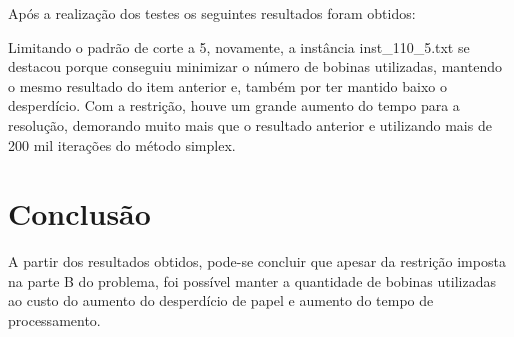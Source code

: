 \documentclass[12pt]{article}
\begin{document}
Após a realização dos testes os seguintes resultados foram obtidos:
\begin{table}[htbp]
    \centering
    \caption{Resultados obtidos após a realização dos testes para a parte B do problema}
\end{table}

Limitando o padrão de corte a 5, novamente, a instância inst\_110\_5.txt se destacou porque conseguiu minimizar 
o número de bobinas utilizadas, mantendo o mesmo resultado do item anterior e, também por ter mantido baixo o 
desperdício. Com a restrição, houve um grande aumento do tempo para a resolução, demorando muito mais que o 
resultado anterior e utilizando mais de 200 mil iterações do método simplex.

\newpage

\section{Conclusão} %

A partir dos resultados obtidos, pode-se concluir que apesar da restrição imposta na parte B do problema, 
foi possível manter a quantidade de bobinas utilizadas ao custo do aumento do desperdício de papel e aumento 
do tempo de processamento.
\end{document}
